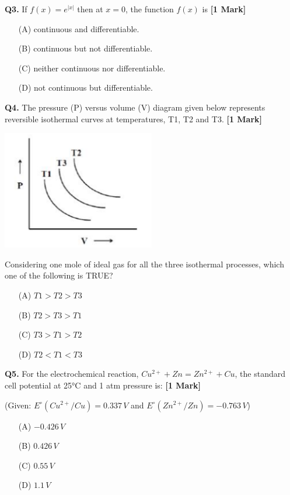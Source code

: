 \documentclass[11pt]{article}
\newcommand{\questiona}[2]{
    \noindent\textbf{Q#2.} #1 \hfill \textbf{[1 Mark]}
}
\begin{document}
\questiona{If \( f(x) = e^{|x|} \) then at \( x = 0 \), the function \( f(x) \) is}{3}
\begin{enumerate}
    \item[(A)] continuous and differentiable.
    \item[(B)] continuous but not differentiable.
    \item[(C)] neither continuous nor differentiable.
    \item[(D)] not continuous but differentiable.
\end{enumerate}
\vspace{0.5cm}

\questiona{The pressure (P) versus volume (V) diagram given below represents reversible isothermal curves at temperatures, T1, T2 and T3.}{4}
\begin{center}
\includegraphics[width=0.5\textwidth]{figures/4.png}
\end{center}
Considering one mole of ideal gas for all the three isothermal processes, which one of the following is TRUE?
\begin{enumerate}
    \item[(A)] $T1 > T2 > T3$
    \item[(B)] $T2 > T3 > T1$
    \item[(C)] $T3 > T1 > T2$
    \item[(D)] $T2 < T1 < T3$
\end{enumerate}
\vspace{0.5cm}

\questiona{For the electrochemical reaction, \( Cu^{2+} + Zn = Zn^{2+} + Cu \), the standard cell potential at 25°C and 1 atm pressure is:}{5}
(Given: \( E^\circ (Cu^{2+}/Cu) = 0.337 \, V \) and \( E^\circ (Zn^{2+}/Zn) = -0.763 \, V \))
\begin{enumerate}
    \item[(A)] \(-0.426 \, V\)
    \item[(B)] \(0.426 \, V\)
    \item[(C)] \(0.55 \, V\)
    \item[(D)] \(1.1 \, V\)
\end{enumerate}
\vspace{0.5cm}
\end{document}
